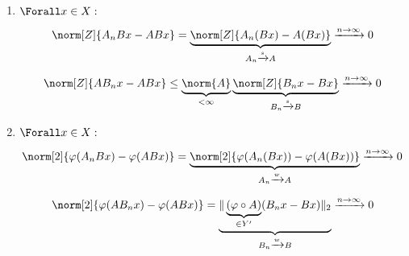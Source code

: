 \begin{solution}
\begin{enumerate}[label = \alph*)]
    \item
    $\Forall x \in X:$

    \begin{align*}
      \norm[Z]{A_n Bx - A B x}
      =
      \underbrace{\norm[Z]{A_n (B x) - A (B x)}}_{A_n \xrightarrow{s} A}
      \xrightarrow{n \to \infty} 0
    \end{align*}

    \begin{align*}
      \norm[Z]{A B_n x - A Bx}
      \leq
      \underbrace{\norm{A}}_{< \infty}
      \underbrace{\norm[Z]{B_n x - B x}}_{B_n \xrightarrow{s} B}
      \xrightarrow{n \to \infty} 0
    \end{align*}

    \item
    $\Forall x \in X:$

    \begin{align*}
      \norm[2]{\varphi(A_n B x) - \varphi(A B x)}
      =
      \underbrace{\norm[2]{\varphi(A_n (B x)) - \varphi(A (B x))}}_{A_n \xrightarrow{w} A}
      \xrightarrow{n \to \infty} 0
    \end{align*}

    \begin{align*}
      \norm[2]{\varphi(A B_n x) - \varphi(A B x)}
      =
      \underbrace
      {
        \|
        \underbrace{(\varphi \circ A)}_{\in Y^\prime}
        (B_n x - B x)
        \|_2
      }_{
        B_n \xrightarrow{w} B
      }
      \xrightarrow{n \to \infty} 0
    \end{align*}

\end{enumerate}

\end{solution}
